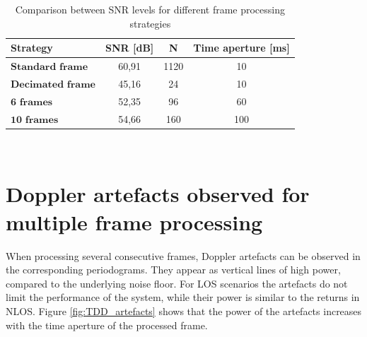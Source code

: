     
\begin{table}[H]
    \centering 
    \begin{tabular}{|p{9em} c c c |}
    \hline
    \rowcolor{bluepoli!40} %
     \textbf{Strategy} & \textbf{SNR [dB]} & \textbf{N} & \textbf{Time aperture [ms]} \T\B \\
    \hline \hline
    $\textbf{Standard frame}$ & 60,91 & 1120 & 10 \T\B \\
    $\textbf{Decimated frame}$ & 45,16 & 24 & 10 \T\B\\
    $\textbf{6 frames}$ & 52,35 & 96 & 60  \T\B\\
    $\textbf{10 frames}$ & 54,66 & 160 & 100  \T\B\\

    \hline
    \end{tabular}
    \\[10pt]
    \caption{Comparison between SNR levels for different frame processing strategies}
    \label{table:TDDstratcomparison}
\end{table}


\section{Doppler artefacts observed for multiple frame processing}

When processing several consecutive frames, Doppler artefacts can be observed in the corresponding periodograms.
They appear as vertical lines of high power, compared to the underlying noise floor.
For LOS scenarios the artefacts do not limit the performance of the system, while their power is similar to the returns in NLOS.
Figure \ref{fig:TDD_artefacts} shows that the power of the artefacts increases with the time aperture of the processed frame.

